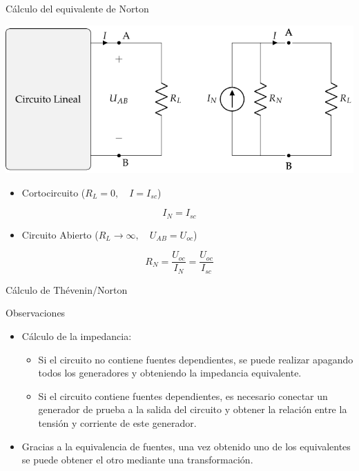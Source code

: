 \documentclass[aspectratio=169, usenames,svgnames,dvipsnames]{beamer}
\begin{document}
\begin{frame}[label={sec:org1f00ac5}]{Cálculo del equivalente de Norton}
\begin{center}
\includegraphics[height=0.43\textheight]{../figs/EquivalenteNorton_R.pdf}
\end{center}

\begin{itemize}
\item Cortocircuito (\(R_L = 0, \quad I = I_{sc}\))
\end{itemize}
\[
\boxed{I_N = I_{sc}}
\]
\begin{itemize}
\item Circuito Abierto (\(R_L \to \infty, \quad U_{AB} = U_{oc}\))
\end{itemize}
\[
\boxed{R_N = \frac{U_{oc}}{I_N} = \frac{U_{oc}}{I_{sc}}}
\]
\end{frame}

\begin{frame}[label={sec:org2db6ac2}]{Cálculo de Thévenin/Norton}
\begin{block}{Observaciones}
\begin{itemize}
\item Cálculo de la impedancia:
\begin{itemize}
\item Si el circuito \alert{no} contiene fuentes dependientes, se puede realizar \alert{apagando} todos los \alert{generadores} y obteniendo la impedancia equivalente.
\item Si el circuito contiene fuentes dependientes, es necesario conectar un \alert{generador de prueba} a la salida del circuito y obtener la relación entre la tensión y corriente de este generador.
\end{itemize}

\item Gracias a la equivalencia de fuentes, una vez obtenido uno de los equivalentes se puede obtener el otro mediante una transformación.
\end{itemize}
\end{block}
\end{frame}
\end{document}

